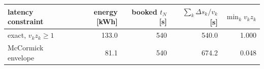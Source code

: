 \begin{tabular}{lrrrr}
\toprule
latency constraint & energy [kWh] & booked $t_N$ [s] & $\sum_k \Delta s_k / v_k$ [s] & $\min_k v_k z_k$ \\
\midrule
exact, $v_k z_k \ge 1$ & 133.0 & 540 & 540.0 & 1.000 \\
McCormick envelope & 81.1 & 540 & 674.2 & 0.048 \\
\bottomrule
\end{tabular}
